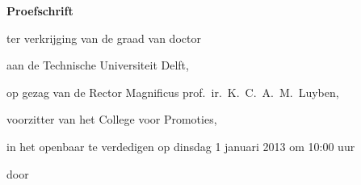\begin{titlepage}

\begin{center}

\vspace*{2\bigskipamount}

{\makeatletter
\titlestyle\bfseries\LARGE\@title
\makeatother}

{\makeatletter
\ifx\@subtitle\undefined\else
    \bigskip
    \titlefont\titleshape\Large\@subtitle
\fi
\makeatother}

\end{center}

\cleardoublepage
\thispagestyle{empty}

\begin{center}


\vspace*{2\bigskipamount}

{\makeatletter
\titlestyle\bfseries\LARGE\@title
\makeatother}

{\makeatletter
\ifx\@subtitle\undefined\else
    \bigskip
    \titlefont\titleshape\Large\@subtitle
\fi
\makeatother}

\vfill


{\Large\titlefont\bfseries Proefschrift}

\bigskip
\bigskip

ter verkrijging van de graad van doctor

aan de Technische Universiteit Delft,

op gezag van de Rector Magnificus prof.~ir.~K.~C.~A.~M.~Luyben,

voorzitter van het College voor Promoties,

in het openbaar te verdedigen op dinsdag 1 januari 2013 om 10:00 uur

\bigskip
\bigskip

door

\bigskip
\bigskip

\makeatletter
{\Large\titlefont\bfseries\@firstname\ {\titleshape\@lastname}}
\makeatother
\\
\vspace{3mm}
\begin{CJK*}{UTF8}{gkai}
\makeatletter
{\LARGE\titlefont\bfseries\@lastnameCH\ \hspace{1mm} {\titleshape\@firstnameCH}}
\makeatother
\end{CJK*}


\end{center}
\end{titlepage}
